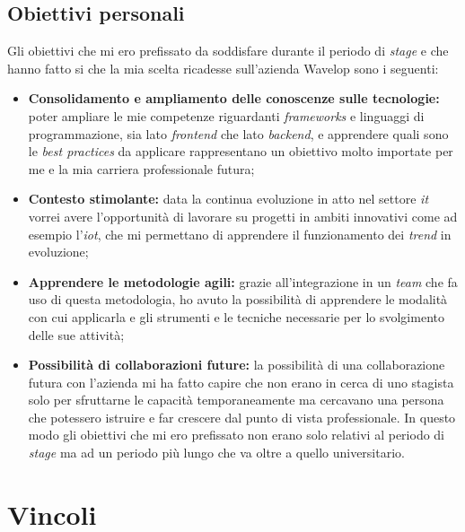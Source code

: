\subsection{Obiettivi personali}
Gli obiettivi che mi ero prefissato da soddisfare durante il periodo di \emph{stage} e che hanno fatto si che la mia scelta ricadesse sull'azienda Wavelop sono i seguenti:
\begin{itemize}
  \item \textbf{Consolidamento e ampliamento delle conoscenze sulle tecnologie:} poter ampliare le mie competenze riguardanti \emph{frameworks} e linguaggi di programmazione, sia lato \emph{\gls{frontend}} che lato \emph{\gls{backend}}, e apprendere quali sono le \emph{best practices} da applicare rappresentano un obiettivo molto importate per me e la mia carriera professionale futura;
  \item \textbf{Contesto stimolante:} data la continua evoluzione in atto nel settore \emph{\acrshort{it}} vorrei avere l'opportunità di lavorare su progetti in ambiti innovativi come ad esempio l'\emph{\acrlong{iot}}, che mi permettano di apprendere il funzionamento dei \emph{trend} in evoluzione;
  \item \textbf{Apprendere le metodologie agili:} grazie all'integrazione in un \emph{team} che fa uso di questa metodologia, ho avuto la possibilità di apprendere le modalità con cui applicarla e gli strumenti e le tecniche necessarie per lo svolgimento delle sue attività;
  \item \textbf{Possibilità di collaborazioni future:} la possibilità di una collaborazione futura con l'azienda mi ha fatto capire che non erano in cerca di uno stagista solo per sfruttarne le capacità temporaneamente ma cercavano una persona che potessero istruire e far crescere dal punto di vista professionale. In questo modo gli obiettivi che mi ero prefissato non erano solo relativi al periodo di \emph{stage} ma ad un periodo più lungo che va oltre a quello universitario.
\end{itemize}

\section{Vincoli}

